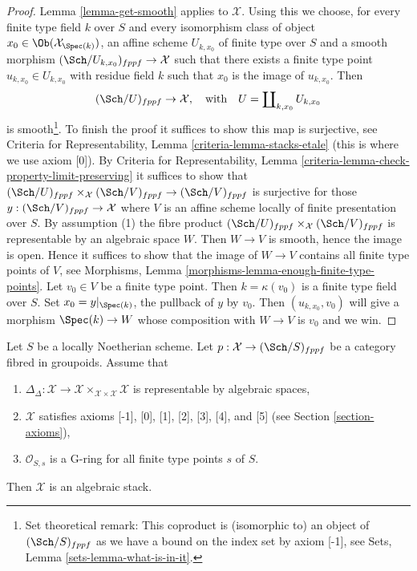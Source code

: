 \begin{proof}
Lemma \ref{lemma-get-smooth} applies to $\mathcal{X}$. Using this we
choose, for every finite type field $k$ over $S$ and every
isomorphism class of object $x_0 \in \Ob(\mathcal{X}_{\Spec(k)})$,
an affine scheme $U_{k, x_0}$ of finite type over $S$ and a smooth morphism
$(\Sch/U_{k, x_0})_{fppf} \to \mathcal{X}$ such that there exists a finite
type point $u_{k, x_0} \in U_{k, x_0}$ with residue field $k$ such that $x_0$
is the image of $u_{k, x_0}$. Then
$$
(\Sch/U)_{fppf} \to \mathcal{X},
\quad\text{with}\quad
U = \coprod\nolimits_{k, x_0} U_{k, x_0}
$$
is smooth\footnote{Set theoretical remark: This coproduct is (isomorphic to)
an object of $(\Sch/S)_{fppf}$ as we have a bound on the index set
by axiom [-1], see Sets, Lemma \ref{sets-lemma-what-is-in-it}.}.
To finish the proof it suffices to show this map is surjective,
see Criteria for Representability, Lemma \ref{criteria-lemma-stacks-etale}
(this is where we use axiom [0]). By Criteria for Representability, Lemma
\ref{criteria-lemma-check-property-limit-preserving}
it suffices to show that
$(\Sch/U)_{fppf} \times_\mathcal{X} (\Sch/V)_{fppf} \to (\Sch/V)_{fppf}$
is surjective for those $y : (\Sch/V)_{fppf} \to \mathcal{X}$ where
$V$ is an affine scheme locally of finite presentation
over $S$. By assumption (1) the fibre product
$(\Sch/U)_{fppf} \times_\mathcal{X} (\Sch/V)_{fppf}$ is representable
by an algebraic space $W$. Then $W \to V$ is smooth, hence the image is
open. Hence it suffices to show that the image of $W \to V$ contains all
finite type points of $V$, see
Morphisms, Lemma \ref{morphisms-lemma-enough-finite-type-points}.
Let $v_0 \in V$ be a finite type point. Then $k = \kappa(v_0)$ is
a finite type field over $S$. Set $x_0 = y|_{\Spec(k)}$,
the pullback of $y$ by $v_0$. Then $(u_{k, x_0}, v_0)$ will give
a morphism $\Spec(k) \to W$ whose composition with $W \to V$
is $v_0$ and we win.
\end{proof}

\begin{proposition}
\label{proposition-second-diagonal-representable}
Let $S$ be a locally Noetherian scheme. Let
$p : \mathcal{X} \to (\Sch/S)_{fppf}$ be a category fibred in groupoids.
Assume that
\begin{enumerate}
\item $\Delta_\Delta : \mathcal{X} \to
\mathcal{X} \times_{\mathcal{X} \times \mathcal{X}} \mathcal{X}$
is representable by algebraic spaces,
\item $\mathcal{X}$ satisfies axioms [-1], [0], [1], [2], [3], [4], and [5]
(see Section \ref{section-axioms}),
\item $\mathcal{O}_{S, s}$ is a G-ring for all finite type points $s$ of $S$.
\end{enumerate}
Then $\mathcal{X}$ is an algebraic stack.
\end{proposition}


